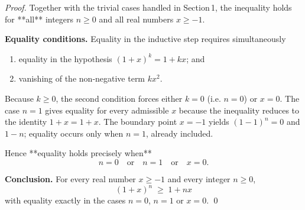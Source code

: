 \begin{proof}
Together with the trivial cases handled in Section 1, the inequality holds for **all** integers \(n\ge 0\) and all real numbers \(x\ge -1\).

\medskip
\textbf{Equality conditions.}  
Equality in the inductive step requires simultaneously  

\begin{enumerate}
\item equality in the hypothesis \((1+x)^{k}=1+kx\); and
\item vanishing of the non‑negative term \(kx^{2}\).
\end{enumerate}
Because \(k\ge 0\), the second condition forces either \(k=0\) (i.e. \(n=0\)) or \(x=0\).
The case \(n=1\) gives equality for every admissible \(x\) because the inequality reduces to the identity \(1+x=1+x\).
The boundary point \(x=-1\) yields \((1-1)^{n}=0\) and \(1-n\); equality occurs only when \(n=1\), already included.

Hence **equality holds precisely when**
\[
n=0\quad\text{or}\quad n=1\quad\text{or}\quad x=0 .
\]

\medskip
\textbf{Conclusion.}  
For every real number \(x\ge -1\) and every integer \(n\ge 0\),
\[
\boxed{\, (1+x)^{n}\;\ge\;1+nx \,}
\]
with equality exactly in the cases \(n=0\), \(n=1\) or \(x=0\). \qed
\end{proof}